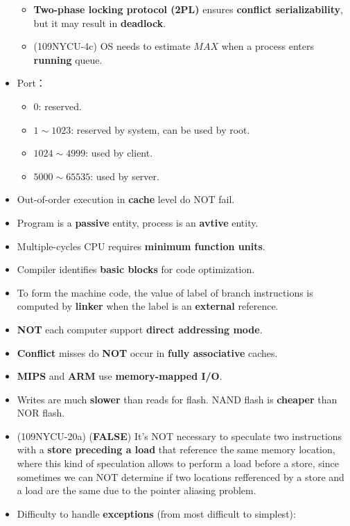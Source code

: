 \begin{itemize}
\begin{itemize}
        \item \textbf{Two-phase locking protocol (2PL)} ensures \textbf{conflict serializability}, but it may result in \textbf{deadlock}.
        \item (109NYCU-4c) OS needs to estimate $MAX$ when a process enters \textbf{running} queue.
    \end{itemize}
    \item Port： \begin{itemize}
        \item $0$: reserved.
        \item $1 \sim 1023$: reserved by system, can be used by root.
        \item $1024 \sim 4999$: used by client.
        \item $5000 \sim 65535$: used by server. 
    \end{itemize}
    \item Out-of-order execution in \textbf{cache} level do NOT fail.
    \item Program is a \textbf{passive} entity, process is an \textbf{avtive} entity.
    \item Multiple-cycles CPU requires \textbf{minimum function units}.
    \item Compiler identifies \textbf{basic blocks} for code optimization.
    \item To form the machine code, the value of label of branch instructions is computed by \textbf{linker} when the label is an \textbf{external} reference.
    \item \textbf{NOT} each computer support \textbf{direct addressing mode}.
    \item \textbf{Conflict} misses do \textbf{NOT} occur in \textbf{fully associative} caches.
    \item \textbf{MIPS} and \textbf{ARM} use \textbf{memory-mapped I/O}.
    \item Writes are much \textbf{slower} than reads for flash. NAND flash is \textbf{cheaper} than NOR flash.
    \item (109NYCU-20a) (\textbf{FALSE}) It's NOT necessary to speculate two instructions with a \textbf{store preceding a load} that reference the same memory location, where this kind of speculation allows to perform a load before a store, since sometimes we can NOT determine if two locations refferenced by a store and a load are the same due to the pointer aliasing problem.
    \item Difficulty to handle \textbf{exceptions} (from most difficult to simplest): \begin{table}[H]

\end{table}
\end{itemize}
